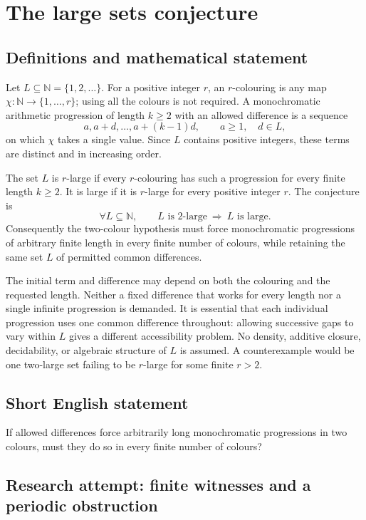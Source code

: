 \documentclass[11pt,a4paper]{article}
\begin{document}
\section*{The large sets conjecture}\label{statement}

\subsection{Definitions and mathematical statement}
Let $L\subseteq\mathbb N=\{1,2,\ldots\}$. For a positive integer $r$,
an $r$-colouring is any map $\chi:\mathbb N\to\{1,\ldots,r\}$; using
all the colours is not required. A monochromatic arithmetic progression
of length $k\ge2$ with an allowed difference is a sequence
\[
 a,a+d,\ldots,a+(k-1)d,\qquad a\ge1,\quad d\in L,
\]
on which $\chi$ takes a single value. Since $L$ contains positive integers,
these terms are distinct and in increasing order.

The set $L$ is $r$-large if every $r$-colouring has such a progression
for every finite length $k\ge2$. It is large if it is $r$-large for every
positive integer $r$.
The conjecture is
\[
 \forall L\subseteq\mathbb N,\qquad
 L\text{ is }2\text{-large}\ \Longrightarrow\ L\text{ is large}.
\]
Consequently the two-colour hypothesis must force monochromatic
progressions of arbitrary finite length in every finite number of colours,
while retaining the same set $L$ of permitted common differences.

The initial term and difference may depend on both the colouring and the
requested length. Neither a fixed difference that works for every length
nor a single infinite progression is demanded. It is essential that each
individual progression uses one common difference throughout: allowing
successive gaps to vary within $L$ gives a different accessibility problem.
No density, additive closure, decidability, or algebraic structure of $L$
is assumed. A counterexample would be one two-large set failing to be
$r$-large for some finite $r>2$.
\subsection{Short English statement}
If allowed differences force arbitrarily long monochromatic progressions in two colours, must they do so in every finite number of colours?
\subsection{Research attempt: finite witnesses and a periodic obstruction}
\end{document}
